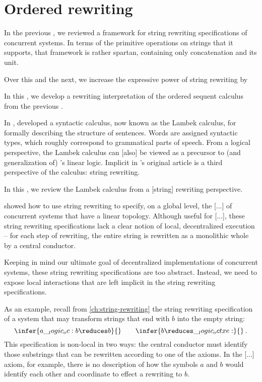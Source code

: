 \chapter{Ordered rewriting}\label{ch:ordered-rewriting}

In the previous , we reviewed a framework for string rewriting specifications of concurrent systems.
In terms of the primitive operations on strings that it supports, that framework is rather spartan, containing only concatenation and its unit.

Over this  and the next, we increase the expressive power of string rewriting by 


In this , we develop a rewriting interpretation of the ordered sequent calculus from the previous .

In \citeyear{Lambek:AMM58}, \citeauthor{Lambek:AMM58} developed a syntactic calculus, now known as the Lambek calculus, for formally describing the structure of sentences.\autocite{Lambek:AMM58}
Words are assigned syntactic types, which roughly correspond to grammatical parts of speech.
From a logical perspective, the Lambek calculus can [also] be viewed as a precursor to (and generalization of) \citeauthor{Girard:TCS87}'s linear logic\autocites{Girard:TCS87}{Lambek:SLIM61}{Abrusci:MLQ90}{Kanazawa:LLI92}{Polakow+Pfenning:MFPS99}.
Implicit in \citeauthor{Lambek:AMM58}'s original article is a third perspective of the calculus: string rewriting.

In this , we review the Lambek calculus from a [string] rewriting perspective.

 showed how to use string rewriting to specify, on a global level, the [...] of concurrent systems that have a linear topology.
Although useful for [...], these string rewriting specifications lack a clear notion of local, decentralized execution -- for each step of rewriting, the entire string is rewritten as a monolithic whole by a central conductor.

Keeping in mind our ultimate goal of decentralized implementations of concurrent systems, these string rewriting specifications are too abstract.
Instead, we need to expose local interactions that are left implicit in the string rewriting specifications.

As an example, recall from \cref{ch:string-rewriting} the string rewriting specification of a system that may transform strings that end with $b$ into the empty string:
\begin{equation}
  \infer{a \oc b \reduces b}{}
  \qquad
  \infer{b \reduces \octxe}{}
  \:.
\end{equation}
This specification is non-local in two ways:
the central conductor must identify those substrings that can be rewritten according to one of the axioms.
In the [...] axiom, for example, there is no description of how the symbols $a$ and $b$ would identify each other and coordinate to effect a rewriting to $b$.

